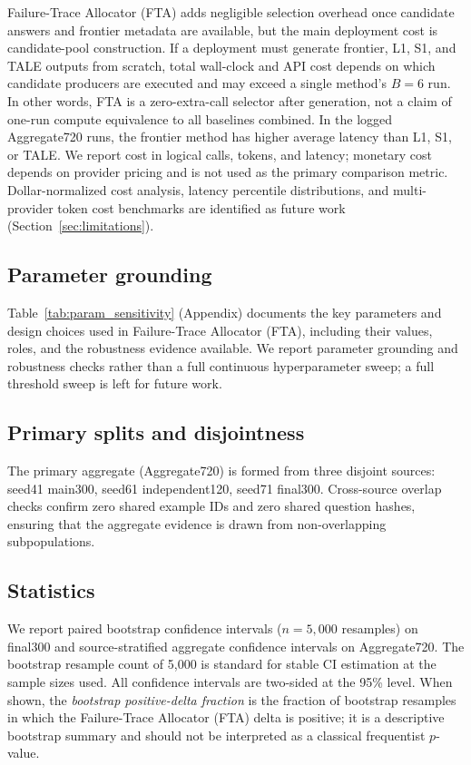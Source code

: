 Failure-Trace Allocator (FTA) adds negligible selection overhead once candidate answers and frontier
metadata are available, but the main deployment cost is candidate-pool construction.
If a deployment must generate frontier, L1, S1, and TALE outputs from scratch, total
wall-clock and API cost depends on which candidate producers are executed and may
exceed a single method's $B=6$ run. In other words, FTA is a zero-extra-call selector
after generation, not a claim of one-run compute equivalence to all baselines combined.
In the logged Aggregate720 runs, the frontier
method has higher average latency than L1, S1, or TALE.
We report cost in logical calls, tokens, and latency; monetary cost depends on provider pricing and is not used as the primary comparison metric.  Dollar-normalized cost analysis, latency percentile distributions, and multi-provider token cost benchmarks are identified as future work (Section~\ref{sec:limitations}).

\subsection{Parameter grounding}
\label{sec:param_grounding}

Table~\ref{tab:param_sensitivity} (Appendix) documents the key parameters and design choices used in Failure-Trace Allocator (FTA), including their values, roles, and the robustness evidence available.  We report parameter grounding and robustness checks rather than a full continuous hyperparameter sweep; a full threshold sweep is left for future work.

\subsection{Primary splits and disjointness}
The primary aggregate (Aggregate720) is formed from three disjoint sources: seed41 main300, seed61 independent120, seed71 final300.  Cross-source overlap checks confirm zero shared example IDs and zero shared question hashes, ensuring that the aggregate evidence is drawn from non-overlapping subpopulations.

\subsection{Statistics}
We report paired bootstrap confidence intervals \citep{efron1993bootstrap} ($n = 5{,}000$ resamples) on final300 and source-stratified aggregate confidence intervals on Aggregate720.  The bootstrap resample count of 5,000 is standard for stable CI estimation at the sample sizes used.  All confidence intervals are two-sided at the 95\% level.  When shown, the \emph{bootstrap positive-delta fraction} is the fraction of bootstrap resamples in which the Failure-Trace Allocator (FTA) delta is positive; it is a descriptive bootstrap summary and should not be interpreted as a classical frequentist $p$-value.

